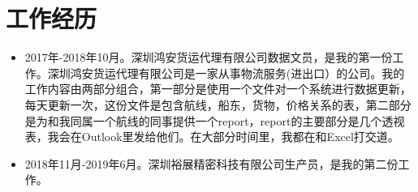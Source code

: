 \section{工作经历}
\begin{itemize}
	\item 2017年-2018年10月。深圳鸿安货运代理有限公司数据文员，是我的第一份工作。深圳鸿安货运代理有限公司是一家从事物流服务(进出口）的公司。我的工作内容由两部分组合，第一部分是使用一个文件对一个系统进行数据更新，每天更新一次，这份文件是包含航线，船东，货物，价格关系的表，第二部分是为和我同属一个航线的同事提供一个report，report的主要部分是几个透视表，我会在Outlook里发给他们。在大部分时间里，我都在和Excel打交道。
	\item 2018年11月-2019年6月。深圳裕展精密科技有限公司生产员，是我的第二份工作。
\end{itemize}
